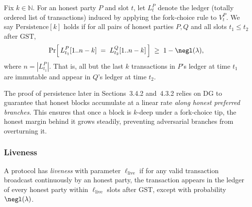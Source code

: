 \begin{definition}\label{appdef:persistence}
Fix $k \in \mathbb{N}$. For an honest party $P$ and slot $t$, let $L_t^P$ denote
the ledger (totally ordered list of transactions) induced by applying the fork-choice
rule to $V_t^P$. We say $\mathrm{Persistence}[k]$ holds if for all pairs of honest
parties $P,Q$ and all slots $t_1 \le t_2$ after $\mathrm{GST}$,
\[
\Pr\!\Big[\, L_{t_1}^P[1..n-k] \;=\; L_{t_2}^Q[1..n-k] \,\Big] \;\ge\; 1-\negl(\lambda),
\]
where $n=|L_{t_1}^P|$. That is, all but the last $k$ transactions in $P$'s ledger
at time $t_1$ are immutable and appear in $Q$'s ledger at time $t_2$.
\end{definition}

\begin{remark}
The proof of persistence later in Sections~3.4.2 and~4.3.2 relies on DG 
to guarantee that honest blocks accumulate at a linear rate \emph{along honest preferred branches}. 
This ensures that once a block is $k$-deep under a fork-choice tip, the honest margin behind it 
grows steadily, preventing adversarial branches from overturning it. 
\end{remark}




\subsubsection{Liveness}
\label{app:liveness}



A protocol has \emph{liveness} with parameter $\ell_{\mathrm{live}}$ if for any valid transaction broadcast continuously by an honest party,
the transaction appears in the ledger of every honest party within $\ell_{\mathrm{live}}$ slots after $\mathrm{GST}$,
except with probability $\negl(\lambda)$.



